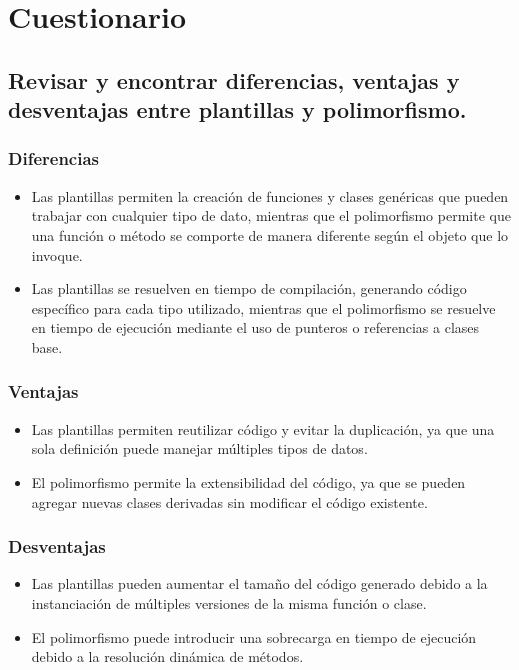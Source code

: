 \section{Cuestionario}

\subsection{Revisar y encontrar diferencias, ventajas y desventajas entre plantillas y polimorfismo.}

\subsubsection{Diferencias}
\begin{itemize}
    \item Las plantillas permiten la creación de funciones y clases genéricas que pueden trabajar con cualquier tipo de dato, mientras que el polimorfismo permite que una función o método se comporte de manera diferente según el objeto que lo invoque.
    \item Las plantillas se resuelven en tiempo de compilación, generando código específico para cada tipo utilizado, mientras que el polimorfismo se resuelve en tiempo de ejecución mediante el uso de punteros o referencias a clases base.
\end{itemize}

\subsubsection{Ventajas}
\begin{itemize}
    \item Las plantillas permiten reutilizar código y evitar la duplicación, ya que una sola definición puede manejar múltiples tipos de datos.
    \item El polimorfismo permite la extensibilidad del código, ya que se pueden agregar nuevas clases derivadas sin modificar el código existente.
\end{itemize}

\subsubsection{Desventajas}
\begin{itemize}
    \item Las plantillas pueden aumentar el tamaño del código generado debido a la instanciación de múltiples versiones de la misma función o clase.
    \item El polimorfismo puede introducir una sobrecarga en tiempo de ejecución debido a la resolución dinámica de métodos.
\end{itemize}

